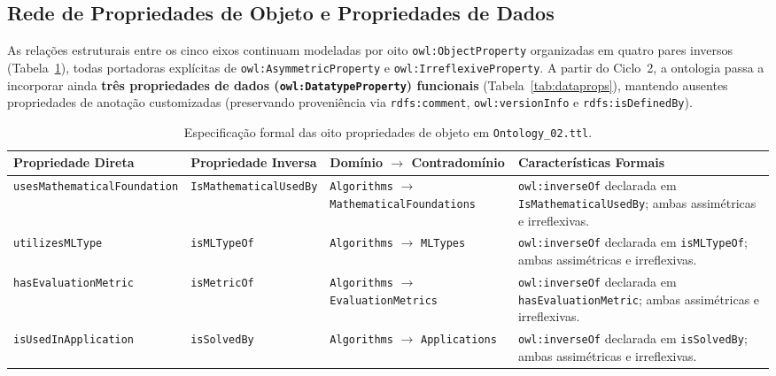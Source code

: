\documentclass[11pt,a4paper]{article}
\newcommand{\onto}[1]{\texttt{#1}}
\begin{document}
\subsection{Rede de Propriedades de Objeto e Propriedades de Dados}

As relações estruturais entre os cinco eixos continuam modeladas por oito \onto{owl:ObjectProperty} organizadas em quatro pares inversos (Tabela~\ref{tab:props}), todas portadoras explícitas de \onto{owl:AsymmetricProperty} e \onto{owl:IrreflexiveProperty}. A partir do Ciclo~2, a ontologia passa a incorporar ainda \textbf{três propriedades de dados (\onto{owl:DatatypeProperty}) funcionais} (Tabela~\ref{tab:dataprops}), mantendo ausentes propriedades de anotação customizadas (preservando proveniência via \onto{rdfs:comment}, \onto{owl:versionInfo} e \onto{rdfs:isDefinedBy}).

\begin{table}[htbp]
\centering
\caption{Especificação formal das oito propriedades de objeto em \texttt{Ontology\_02.ttl}.}
\label{tab:props}
\footnotesize
\begin{tabularx}{\textwidth}{@{}p{4.2cm}p{3.1cm}p{3.9cm}>{\raggedright\arraybackslash}X@{}}
\toprule
\textbf{Propriedade Direta} & \textbf{Propriedade Inversa} & \textbf{Domínio $\rightarrow$ Contradomínio} & \textbf{Características Formais} \\
\midrule
\onto{usesMathematicalFoundation} & \onto{IsMathematicalUsedBy} & \onto{Algorithms} $\rightarrow$ \newline \onto{MathematicalFoundations} & \onto{owl:inverseOf} declarada em \onto{IsMathematicalUsedBy}; ambas assimétricas e irreflexivas. \\
\addlinespace[3pt]
\onto{utilizesMLType} & \onto{isMLTypeOf} & \onto{Algorithms} $\rightarrow$ \newline \onto{MLTypes} & \onto{owl:inverseOf} declarada em \onto{isMLTypeOf}; ambas assimétricas e irreflexivas. \\
\addlinespace[3pt]
\onto{hasEvaluationMetric} & \onto{isMetricOf} & \onto{Algorithms} $\rightarrow$ \newline \onto{EvaluationMetrics} & \onto{owl:inverseOf} declarada em \onto{hasEvaluationMetric}; ambas assimétricas e irreflexivas. \\
\addlinespace[3pt]
\onto{isUsedInApplication} & \onto{isSolvedBy} & \onto{Algorithms} $\rightarrow$ \newline \onto{Applications} & \onto{owl:inverseOf} declarada em \onto{isSolvedBy}; ambas assimétricas e irreflexivas. \\
\bottomrule
\end{tabularx}
\end{table}
\end{document}
